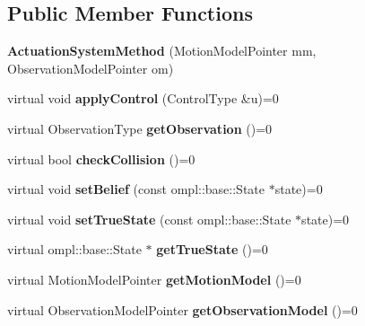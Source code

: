 \subsection*{\-Public \-Member \-Functions}
\begin{DoxyCompactItemize}
\item 
\hypertarget{class_actuation_system_method_a140d1929d9ba39eeda45233ede7291f5}{{\bfseries \-Actuation\-System\-Method} (\-Motion\-Model\-Pointer mm, \-Observation\-Model\-Pointer om)}\label{class_actuation_system_method_a140d1929d9ba39eeda45233ede7291f5}

\item 
\hypertarget{class_actuation_system_method_a8380694aec22c19388bc463af9d0c12d}{virtual void {\bfseries apply\-Control} (\-Control\-Type \&u)=0}\label{class_actuation_system_method_a8380694aec22c19388bc463af9d0c12d}

\item 
\hypertarget{class_actuation_system_method_a68d37d0f01992b30a014adbd971d7d6f}{virtual \-Observation\-Type {\bfseries get\-Observation} ()=0}\label{class_actuation_system_method_a68d37d0f01992b30a014adbd971d7d6f}

\item 
\hypertarget{class_actuation_system_method_aac1d548e63d19bde0dcf6b44bf3b644f}{virtual bool {\bfseries check\-Collision} ()=0}\label{class_actuation_system_method_aac1d548e63d19bde0dcf6b44bf3b644f}

\item 
\hypertarget{class_actuation_system_method_a96352d97bd055a0cc33871f9afde9456}{virtual void {\bfseries set\-Belief} (const ompl\-::base\-::\-State $\ast$state)=0}\label{class_actuation_system_method_a96352d97bd055a0cc33871f9afde9456}

\item 
\hypertarget{class_actuation_system_method_a85738bc14a387b5c04c266b046768c34}{virtual void {\bfseries set\-True\-State} (const ompl\-::base\-::\-State $\ast$state)=0}\label{class_actuation_system_method_a85738bc14a387b5c04c266b046768c34}

\item 
\hypertarget{class_actuation_system_method_a20ef48b160e9072fd28aadc992fd66d5}{virtual ompl\-::base\-::\-State $\ast$ {\bfseries get\-True\-State} ()=0}\label{class_actuation_system_method_a20ef48b160e9072fd28aadc992fd66d5}

\item 
\hypertarget{class_actuation_system_method_a75449aaf949ef6fbe19b3ef0d2a60d27}{virtual \-Motion\-Model\-Pointer {\bfseries get\-Motion\-Model} ()=0}\label{class_actuation_system_method_a75449aaf949ef6fbe19b3ef0d2a60d27}

\item 
\hypertarget{class_actuation_system_method_a229e5c520570c541218640e5ff25ae5c}{virtual \-Observation\-Model\-Pointer {\bfseries get\-Observation\-Model} ()=0}\label{class_actuation_system_method_a229e5c520570c541218640e5ff25ae5c}

\end{DoxyCompactItemize}
